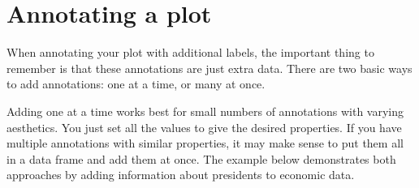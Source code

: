 \section{Annotating a plot}
\label{sec:annotating}

When annotating your plot with additional labels, the important thing to remember is that these annotations are just extra data.  There are two basic ways to add annotations: one at a time, or many at once.

Adding one at a time works best for small numbers of annotations with varying aesthetics. You just set all the values to give the desired properties. If you have multiple annotations with similar properties, it may make sense to put them all in a data frame and add them at once. The example below demonstrates both approaches by adding information about presidents to economic data.

% 
% 
% 
% 


